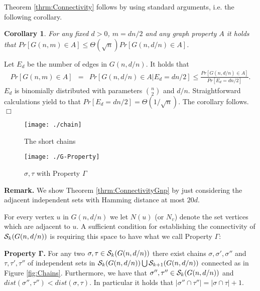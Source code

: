 \documentclass[a4paper,10pt]{article}
\makeatletter
\newtheorem{corollary}{Corollary}\renewcommand{\thecorollary}{\arabic{corollary}}
\newenvironment{proof}{\noindent{\bf Proof\@:}}{\hfill $\Box$\\}
\makeatother
\begin{document}
\noindent
Theorem \ref{thrm:Connectivity} follows by using standard arguments, i.e. the following corollary.
\begin{corollary}
For any fixed $d>0$, $m=dn/2$ and any graph property $A$ it holds that
$Pr[G(n,m)\in A]\leq \Theta(\sqrt{n})Pr[G(n,d/n)\in A]$.
\end{corollary}  
\begin{proof}
Let $E_d$ be the number of edges in $G(n,d/n)$. It holds that
\begin{eqnarray}
Pr[G(n,m)\in A]&=&Pr[G(n,d/n)\in A|E_d=dn/2]\leq \frac{Pr[G(n,d/n)\in A]}{Pr[E_d=dn/2]}.
\nonumber
\end{eqnarray}
$E_d$ is binomially distributed with parameters ${n \choose 2}$ and $d/n$.
Straightforward calculations yield to that $Pr[E_d=dn/2]=\Theta(1/\sqrt{n})$.
The corollary follows.
\end{proof}



\begin{figure}
\begin{minipage}{0.5\textwidth}
	\centering
		\texttt{[image: ./chain]}
	\caption{ The short chains}
	\label{fig:Chains}
\end{minipage}
\begin{minipage}{0.5\textwidth}
	\centering
		\texttt{[image: ./G-Property]}
	\caption{ $\sigma, \tau$ with Property $\Gamma$ }
	\label{fig:G-Property}
\end{minipage}
\end{figure}


\noindent
{\bf Remark.} 
We show Theorem \ref{thrm:ConnectivityGnp} by just considering 
the adjacent independent sets with Hamming distance at most $20d$.
\\ \vspace{-.3cm}



\noindent
For every vertex $u$ in $G(n,d/n)$ we let $N(u)$  (or $N_v$)
denote the  set vertices which are  adjacent to $u$.
A sufficient condition for establishing the connectivity of
${\cal S}_k(G(n,d/n))$ is requiring this space to have what
we call  Property $\Gamma$:\\ \vspace{-.3cm}

\noindent
{\bf Property $\boldsymbol{\Gamma}$.}
For any two  $\sigma, \tau \in {\cal S}_k(G(n,d/n))$ there 
exist chains $\sigma, \sigma', \sigma''$ and $\tau,\tau',\tau''$ of 
independent sets in ${\cal S}_k(G(n,d/n))\bigcup {\cal S}_{k+1}
(G(n,d/n))$ connected as in Figure \ref{fig:Chains}.
Furthermore, we have that $\sigma'', \tau''\in{\cal S}_k(G(n,d/n))$
and $dist(\sigma'', \tau'')<dist(\sigma, \tau)$. In particular it holds
that $|\sigma''\cap \tau''| = |\sigma\cap \tau|+1$.\\ \vspace{-.3cm}
\end{document}
